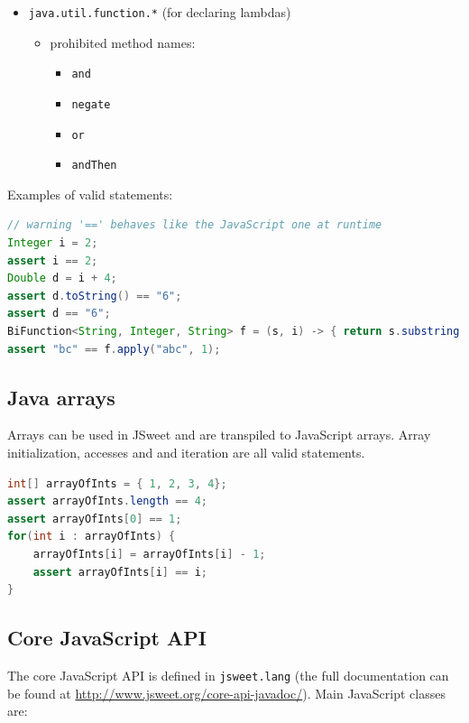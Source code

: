 \documentclass[a4paper]{report}
\begin{document}
\begin{itemize}
\begin{itemize}
	\end{itemize}
\item \texttt{java.util.function.*} (for declaring lambdas)
	\begin{itemize}
	\item prohibited method names: 
			\begin{itemize}
				\item \texttt{and}
				\item \texttt{negate} 
				\item \texttt{or}
				\item \texttt{andThen}
			\end{itemize}
	\end{itemize}
\end{itemize}

\noindent
Examples of valid statements:

\begin{lstlisting}[language=Java]
// warning '==' behaves like the JavaScript one at runtime
Integer i = 2;
assert i == 2;
Double d = i + 4;
assert d.toString() == "6";
assert d == "6";
BiFunction<String, Integer, String> f = (s, i) -> { return s.substring(i); };
assert "bc" == f.apply("abc", 1);
\end{lstlisting}

\subsection{Java arrays}

Arrays can be used in JSweet and are transpiled to JavaScript arrays. Array initialization, accesses and and iteration are all valid statements.

\begin{lstlisting}[language=Java]
int[] arrayOfInts = { 1, 2, 3, 4};
assert arrayOfInts.length == 4;  
assert arrayOfInts[0] == 1;
for(int i : arrayOfInts) {
	arrayOfInts[i] = arrayOfInts[i] - 1;
	assert arrayOfInts[i] == i;
}
\end{lstlisting}

\subsection{Core JavaScript API}

The core JavaScript API is defined in \texttt{jsweet.lang} (the full documentation can be found at \url{http://www.jsweet.org/core-api-javadoc/}). Main JavaScript classes are:
\end{document}

